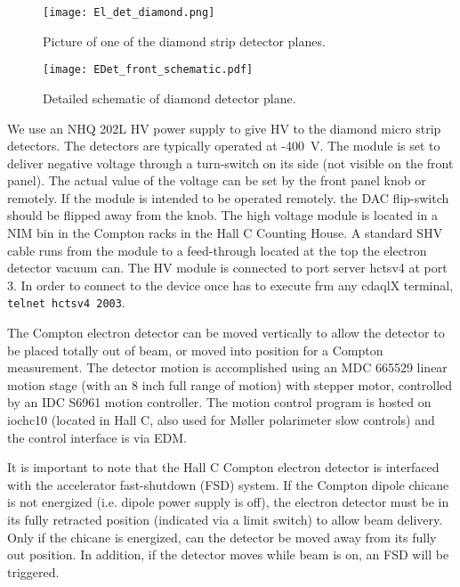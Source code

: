 {\begin{figure}[htp]
\begin{center}
\texttt{[image: El\_det\_diamond.png]}
\caption{Picture of one of the diamond strip detector planes.\label{fig:edet_photo}}
\end{center}
\end{figure}

\begin{figure}[htp]
\begin{center}
\texttt{[image: EDet\_front\_schematic.pdf]}
\caption{Detailed schematic of diamond detector plane.\label{fig:edet_schematic}}
\end{center}
\end{figure}

We use an NHQ 202L HV power supply to give HV to the diamond micro strip detectors. The detectors are
typically operated at -400~V. The module is set to deliver negative voltage through a turn-switch on its side
(not visible on the front panel). The actual value of the voltage can be set by the front panel knob or
remotely. If the module is intended to be operated remotely. the DAC flip-switch should be flipped away from
the knob. The high voltage module is located in a NIM bin in the Compton racks in the Hall C Counting House.
A standard SHV cable runs from the module to a feed-through located at the top the electron detector
vacuum can. The HV module is connected to port server hctsv4 at port 3. In order to connect to the device
once has to execute frm any cdaqlX terminal, \texttt{telnet hctsv4 2003}.

The Compton electron detector can be moved vertically to allow the detector to be placed totally out of beam,
or moved into position for a Compton measurement. The detector motion is accomplished using an MDC 665529
linear motion stage (with an 8 inch full range of motion) with stepper motor, controlled by an IDC S6961
motion controller.  The motion control program is hosted on iochc10 (located in Hall C, also used for
M\o ller polarimeter slow controls) and the control interface is via EDM.

It is important to note that the Hall C Compton electron detector is interfaced with the accelerator
fast-shutdown (FSD) system. If the Compton dipole chicane is not energized (i.e. dipole power supply is off),
the electron detector must be in its fully retracted position (indicated via a limit switch) to allow
beam delivery. Only if the chicane is energized, can the detector be moved away from its fully out
position. In addition, if the detector moves while beam is on, an FSD will be triggered.

}
